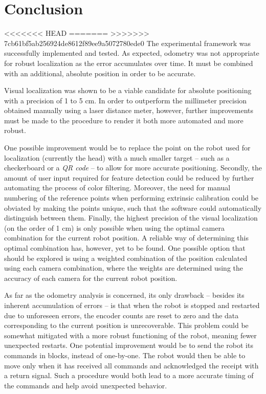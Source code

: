 
\section{Conclusion}

\setlength{\parskip}{1em}
<<<<<<< HEAD
=======
>>>>>>> 7cb61bf5ab256924de8612f89ee9a5072780ede0
The experimental framework was successfully implemented and tested. 
As expected, odometry was not appropriate for robust localization as the error accumulates over time. 
It must be combined with an additional, absolute position in order to be accurate.

Visual localization was shown to be a viable candidate for absolute positioning with a precision of 1 to 5 cm. 
In order to outperform the millimeter precision obtained manually using a laser distance meter, however, further improvements must be made to the procedure to render it both more automated and more robust. 

One possible improvement would be to replace the point on the robot used for localization (currently the head) with a much smaller target -- such as a checkerboard or a \textit{QR code} -- to allow for more accurate positioning. 
Secondly, the amount of user input required for feature detection could be reduced by further automating the process of color filtering. 
Moreover, the need for manual numbering of the reference points when performing extrinsic calibration could be obviated by making the points unique, such that the software could automatically distinguish between them.
Finally, the highest precision of the visual localization (on the order of 1 cm) is only possible when using the optimal camera combination for the current robot position. 
A reliable way of determining this optimal combination has, however, yet to be found. 
One possible option that should be explored is using a weighted combination of the position calculated using each camera combination, where the weights are determined using the accuracy of each camera for the current robot position.


As far as the odometry analysis is concerned, its only drawback -- besides its inherent accumulation of errors -- is that when the robot is stopped and restarted due to unforeseen errors, the encoder counts are reset to zero and the data corresponding to the current position is unrecoverable.
This problem could be somewhat mitigated with a more robust functioning of the robot, meaning fewer unexpected restarts.
One potential improvement would be to send the robot its commands in blocks, instead of one-by-one. 
The robot would then be able to move only when it has received all commands and acknowledged the receipt with a return signal. 
Such a procedure would both lead to a more accurate timing of the commands and help avoid unexpected behavior.

